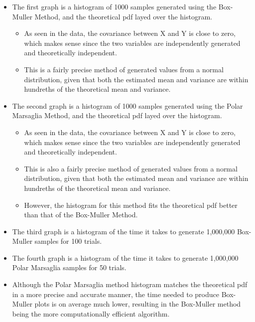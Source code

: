 \documentclass[11pt]{article}
\makeatletter
\providecommand{\tightlist}{%
      \setlength{\itemsep}{0pt}\setlength{\parskip}{0pt}}
\newcommand{\boxspacing}{\kern\kvtcb@left@rule\kern\kvtcb@boxsep}
\newcommand{\prompt}[4]{
        \ttfamily\llap{{\color{#2}[#3]:\hspace{3pt}#4}}\vspace{-\baselineskip}
    }
\makeatother
\begin{document}
\begin{itemize}
\tightlist
\item
  The first graph is a histogram of 1000 samples generated using the
  Box-Muller Method, and the theoretical pdf layed over the histogram.

  \begin{itemize}
  \tightlist
  \item
    As seen in the data, the covariance between X and Y is close to
    zero, which makes sense since the two variables are independently
    generated and theoretically independent.
  \item
    This is a fairly precise method of generated values from a normal
    distribution, given that both the estimated mean and variance are
    within hundreths of the theoretical mean and variance.
  \end{itemize}
\item
  The second graph is a histogram of 1000 samples generated using the
  Polar Marsaglia Method, and the theoretical pdf layed over the
  histogram.

  \begin{itemize}
  \tightlist
  \item
    As seen in the data, the covariance between X and Y is close to
    zero, which makes sense since the two variables are independently
    generated and theoretically independent.
  \item
    This is also a fairly precise method of generated values from a
    normal distribution, given that both the estimated mean and variance
    are within hundreths of the theoretical mean and variance.
  \item
    However, the histogram for this method fits the theoretical pdf
    better than that of the Box-Muller Method.
  \end{itemize}
\item
  The third graph is a histogram of the time it takes to generate
  1,000,000 Box-Muller samples for 100 trials.
\item
  The fourth graph is a histogram of the time it takes to generate
  1,000,000 Polar Marsaglia samples for 50 trials.
\item
  Although the Polar Marsaglia method histogram matches the theoretical
  pdf in a more precise and accurate manner, the time needed to produce
  Box-Muller plots is on average much lower, resulting in the Box-Muller
  method being the more computationally efficient algorithm.
\end{itemize}

    \begin{tcolorbox}[breakable, size=fbox, boxrule=1pt, pad at break*=1mm,colback=cellbackground, colframe=cellborder]
\prompt{In}{incolor}{ }{\boxspacing}
\begin{Verbatim}[commandchars=\\\{\}]

\end{Verbatim}
\end{tcolorbox}


    
    
    
\end{document}
